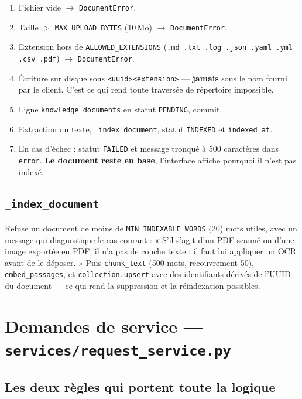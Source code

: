 \documentclass[11pt,a4paper]{report}
\newcommand{\file}[1]{\texttt{\small #1}}
\newcommand{\fn}[1]{\texttt{\small\textcolor{oasisviolet}{#1}}}
\newcommand{\cls}[1]{\texttt{\small\textcolor{oasisblue}{#1}}}
\newcommand{\tbl}[1]{\texttt{\small\textcolor{oasisamber}{#1}}}
\newcommand{\arrowto}{\ensuremath{\rightarrow}}
\begin{document}
\begin{enumerate}
  \item Fichier vide \arrowto{} \cls{DocumentError}.
  \item Taille \(>\) \texttt{MAX\_UPLOAD\_BYTES} (10\,Mo) \arrowto{}
  \cls{DocumentError}.
  \item Extension hors de \texttt{ALLOWED\_EXTENSIONS}
  (\texttt{.md .txt .log .json .yaml .yml .csv .pdf}) \arrowto{}
  \cls{DocumentError}.
  \item Écriture sur disque sous \texttt{<uuid><extension>} --- \textbf{jamais}
  sous le nom fourni par le client. C'est ce qui rend toute traversée de
  répertoire impossible.
  \item Ligne \tbl{knowledge\_documents} en statut \texttt{PENDING}, commit.
  \item Extraction du texte, \fn{\_index\_document}, statut \texttt{INDEXED} et
  \texttt{indexed\_at}.
  \item En cas d'échec : statut \texttt{FAILED} et message tronqué à 500
  caractères dans \texttt{error}. \textbf{Le document reste en base}, l'interface
  affiche pourquoi il n'est pas indexé.
\end{enumerate}

\subsection*{\fn{\_index\_document}}
Refuse un document de moins de \texttt{MIN\_INDEXABLE\_WORDS} (20) mots utiles,
avec un message qui diagnostique le cas courant : « S'il s'agit d'un PDF scanné
ou d'une image exportée en PDF, il n'a pas de couche texte : il faut lui
appliquer un OCR avant de le déposer. » Puis \fn{chunk\_text} (500 mots,
recouvrement 50), \fn{embed\_passages}, et \texttt{collection.upsert} avec des
identifiants dérivés de l'UUID du document --- ce qui rend la suppression et la
réindexation possibles.

\section{Demandes de service --- \file{services/request\_service.py}}

\subsection*{Les deux règles qui portent toute la logique}
\end{document}
